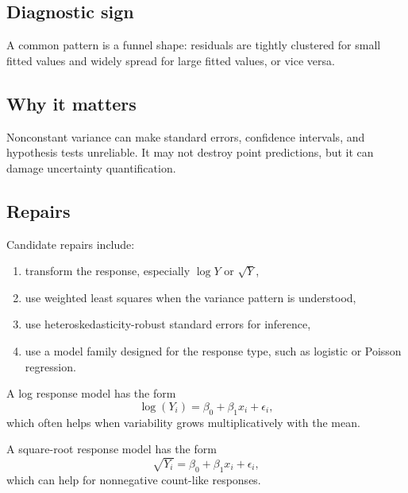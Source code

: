 \subsection*{Diagnostic sign}

A common pattern is a funnel shape: residuals are tightly clustered for small fitted values and widely spread for large fitted values, or vice versa.

\subsection*{Why it matters}

Nonconstant variance can make standard errors, confidence intervals, and hypothesis tests unreliable.  It may not destroy point predictions, but it can damage uncertainty quantification.

\subsection*{Repairs}

Candidate repairs include:
\begin{enumerate}
  \item transform the response, especially \(\log Y\) or \(\sqrt{Y}\),
  \item use weighted least squares when the variance pattern is understood,
  \item use heteroskedasticity-robust standard errors for inference,
  \item use a model family designed for the response type, such as logistic or Poisson regression.
\end{enumerate}

A log response model has the form
\begin{equation}
  \log(Y_i)=\beta_0+\beta_1x_i+\epsilon_i,
\end{equation}
which often helps when variability grows multiplicatively with the mean.

A square-root response model has the form
\begin{equation}
  \sqrt{Y_i}=\beta_0+\beta_1x_i+\epsilon_i,
\end{equation}
which can help for nonnegative count-like responses.

